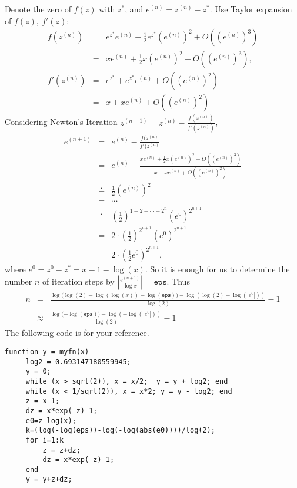 \begin{problem}
\begin{subproblem}[4]
   \cprotEnv \begin{solution}
Denote the zero of $f(z)$ with $z^*$, and $e^{(n)}=z^{(n)}-z^*$.
Use Taylor expansion of $f(z),~f'(z)$:
\begin{eqnarray*}
f(z^{(n)})&=&e^{z^*}e^{(n)}+\frac{1}{2}e^{z^*}(e^{(n)})^2+O((e^{(n)})^3)\\
&=&xe^{(n)}+\frac{1}{2}x(e^{(n)})^2+O((e^{(n)})^3),\\
f'(z^{(n)})&=&e^{z^*}+e^{z^*}e^{(n)}+O((e^{(n)})^2)\\
&=&x+xe^{(n)}+O((e^{(n)})^2)
\end{eqnarray*}
Considering Newton's Iteration
$z^{(n+1)}=z^{(n)}-\frac{f(z^{(n)})}{f'(z^{(n)})}$,
\begin{eqnarray*}
e^{(n+1)}&=&e^{(n)}-\frac{f(z^{(n)}}{f'(z^{(n)}}\\
&=&e^{(n)}-\frac{xe^{(n)}+\frac{1}{2}x(e^{(n)})^2+O((e^{(n)})^3)}{x+xe^{(n)}+O((e^{(n)})^2)}\\
&\doteq&\frac{1}{2}(e^{(n)})^2\\
&=&\cdots\\
&\doteq&(\frac{1}{2})^{1+2+\cdots+2^n}(e^0)^{2^{n+1}}\\
&=&2\cdot(\frac{1}{2})^{2^{n+1}}(e^0)^{2^{n+1}}\\
&=&2\cdot(\frac{1}{2}e^0)^{2^{n+1}},
\end{eqnarray*}
where $e^0=z^0-z^*=x-1-\log{(x)}$. So it is enough for us to
 determine the number $n$ of iteration steps by
$|\frac{e^{(n+1)}}{\log{x}}|=\mathtt{eps}$. Thus
\begin{eqnarray*}
n&=&\frac{\log{(\log{(2)}-\log{(\log{(x)})}-\log{\mathtt{(eps)})}}-\log{(\log{(2)}-\log{(|e^0|)})}}{\log{(2)}}-1\\
&\approx & \frac{\log{(-\log{\mathtt{(eps)})}}-\log{(-\log{(|e^0|)})}}{\log{(2)}}-1
\end{eqnarray*}
The following code is for your reference.
\begin{lstlisting}[style=cppsimple]
 function y = myfn(x)
     log2 = 0.693147180559945;
     y = 0;
     while (x > sqrt(2)), x = x/2;  y = y + log2; end
     while (x < 1/sqrt(2)), x = x*2; y = y - log2; end
     z = x-1;
     dz = x*exp(-z)-1;
     e0=z-log(x);
     k=(log(-log(eps))-log(-log(abs(e0))))/log(2);
     for i=1:k
         z = z+dz;
         dz = x*exp(-z)-1;
     end
     y = y+z+dz;
\end{lstlisting}
\end{solution}
\end{subproblem}
\end{problem}